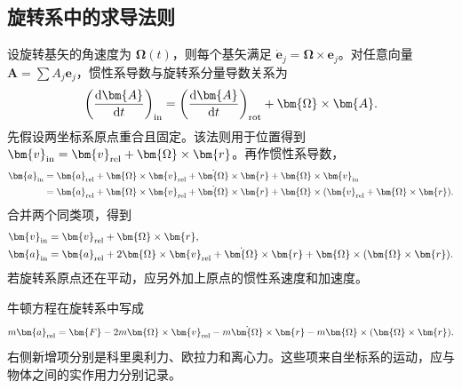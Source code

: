 \documentclass[11pt,openany,fontset=fandol]{ctexbook}
\theoremstyle{plain}\newtheorem{theorem}{定理}[chapter]\newtheorem{proposition}[theorem]{命题}
\theoremstyle{definition}\newtheorem{definition}{定义}[chapter]\newtheorem{example}{例}[chapter]
\theoremstyle{remark}\newtheorem*{remark}{说明}
\newcommand{\dd}{\mathop{}\!\mathrm d}\newcommand{\ii}{\mathrm i}\newcommand{\ee}{\mathrm e}
\newcommand{\vct}[1]{\bm{#1}}\newcommand{\Rea}{\operatorname{Re}}\newcommand{\Ima}{\operatorname{Im}}
\begin{document}
\subsection{旋转系中的求导法则}
设旋转基矢的角速度为 $\vct\Omega(t)$，则每个基矢满足 $\dot{\vct e}_j=\vct\Omega\times\vct e_j$。对任意向量 $\vct A=\sum A_j\vct e_j$，惯性系导数与旋转系分量导数关系为
\begin{equation}
\left(\frac{\dd\vct A}{\dd t}\right)_{\rm in}
=\left(\frac{\dd\vct A}{\dd t}\right)_{\rm rot}+\vct\Omega\times\vct A.
\end{equation}
先假设两坐标系原点重合且固定。该法则用于位置得到$\vct v_{\rm in}=\vct v_{\rm rel}+\vct\Omega\times\vct r$。再作惯性系导数，
\[\begin{aligned}
\vct a_{\rm in}
&=\vct a_{\rm rel}+\vct\Omega\times\vct v_{\rm rel}
+\dot{\vct\Omega}\times\vct r
+\vct\Omega\times\vct v_{\rm in}\\
&=\vct a_{\rm rel}+\vct\Omega\times\vct v_{\rm rel}
+\dot{\vct\Omega}\times\vct r
+\vct\Omega\times(\vct v_{\rm rel}+\vct\Omega\times\vct r).
\end{aligned}\]
合并两个同类项，得到
\begin{align}
\vct v_{\rm in}&=\vct v_{\rm rel}+\vct\Omega\times\vct r,\\
\vct a_{\rm in}&=\vct a_{\rm rel}+2\vct\Omega\times\vct v_{\rm rel}
+\dot{\vct\Omega}\times\vct r+\vct\Omega\times(\vct\Omega\times\vct r).
\end{align}
若旋转系原点还在平动，应另外加上原点的惯性系速度和加速度。

牛顿方程在旋转系中写成
\[
m\vct a_{\rm rel}=\vct F-2m\vct\Omega\times\vct v_{\rm rel}
-m\dot{\vct\Omega}\times\vct r-m\vct\Omega\times(\vct\Omega\times\vct r).
\]
右侧新增项分别是科里奥利力、欧拉力和离心力。这些项来自坐标系的运动，应与物体之间的实作用力分别记录。
\end{document}
